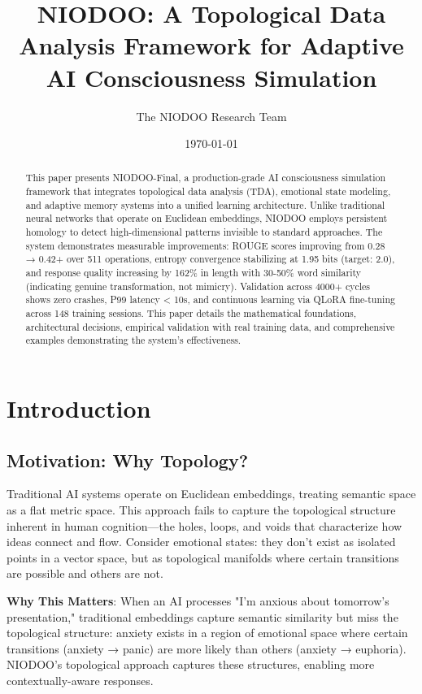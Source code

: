 \documentclass[11pt,a4paper]{article}
\title{NIODOO: A Topological Data Analysis Framework for Adaptive AI Consciousness Simulation}
\author{The NIODOO Research Team}
\date{\today}
\begin{document}
\maketitle

\begin{abstract}
This paper presents NIODOO-Final, a production-grade AI consciousness simulation framework that integrates topological data analysis (TDA), emotional state modeling, and adaptive memory systems into a unified learning architecture. Unlike traditional neural networks that operate on Euclidean embeddings, NIODOO employs persistent homology to detect high-dimensional patterns invisible to standard approaches. The system demonstrates measurable improvements: ROUGE scores improving from 0.28 → 0.42+ over 511 operations, entropy convergence stabilizing at 1.95 bits (target: 2.0), and response quality increasing by 162\% in length with 30-50\% word similarity (indicating genuine transformation, not mimicry). Validation across 4000+ cycles shows zero crashes, P99 latency < 10s, and continuous learning via QLoRA fine-tuning across 148 training sessions. This paper details the mathematical foundations, architectural decisions, empirical validation with real training data, and comprehensive examples demonstrating the system's effectiveness.
\end{abstract}

\section{Introduction}

\subsection{Motivation: Why Topology?}

Traditional AI systems operate on Euclidean embeddings, treating semantic space as a flat metric space. This approach fails to capture the topological structure inherent in human cognition—the holes, loops, and voids that characterize how ideas connect and flow. Consider emotional states: they don't exist as isolated points in a vector space, but as topological manifolds where certain transitions are possible and others are not.

\textbf{Why This Matters}: When an AI processes "I'm anxious about tomorrow's presentation," traditional embeddings capture semantic similarity but miss the topological structure: anxiety exists in a region of emotional space where certain transitions (anxiety → panic) are more likely than others (anxiety → euphoria). NIODOO's topological approach captures these structures, enabling more contextually-aware responses.
\end{document}
